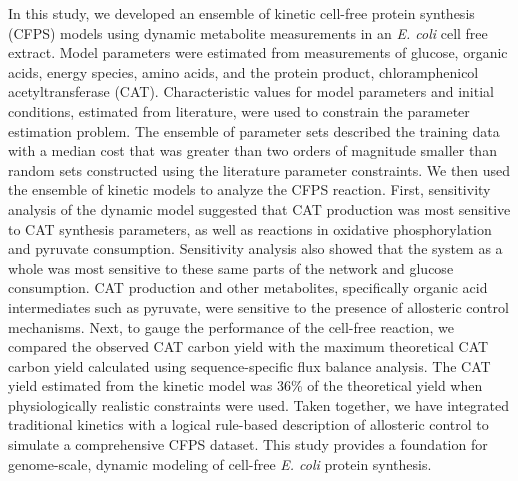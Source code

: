 \documentclass[12pt]{article}
\begin{document}
In this study, we developed an ensemble of kinetic cell-free protein synthesis (CFPS) models using dynamic metabolite measurements in an \textit{E. coli} cell free extract.
Model parameters were estimated from measurements of glucose, organic acids, energy species, amino acids, and the protein product, chloramphenicol acetyltransferase (CAT).
Characteristic values for model parameters and initial conditions, estimated from literature, were used to constrain the parameter estimation problem.
The ensemble of parameter sets described the training data with a median cost that was greater than two orders of magnitude smaller than random sets constructed using the literature parameter constraints. We then used the ensemble of kinetic models to analyze the CFPS reaction.
First, sensitivity analysis of the dynamic model suggested that CAT production was most sensitive to CAT synthesis parameters, as well as reactions in oxidative phosphorylation and pyruvate consumption.
Sensitivity analysis also showed that the system as a whole was most sensitive to these same parts of the network and glucose consumption.
CAT production and other metabolites, specifically organic acid intermediates such as pyruvate, were sensitive to the presence of allosteric control mechanisms.
Next, to gauge the performance of the cell-free reaction, we compared the observed CAT carbon yield with the maximum theoretical CAT carbon yield calculated using sequence-specific flux balance analysis. The CAT yield estimated from the kinetic model was 36\% of the theoretical yield when physiologically realistic constraints were used.
Taken together, we have integrated traditional kinetics with a logical rule-based description of allosteric control to simulate a comprehensive CFPS dataset.
This study provides a foundation for genome-scale, dynamic modeling of cell-free \textit{E. coli} protein synthesis.
\end{document}
